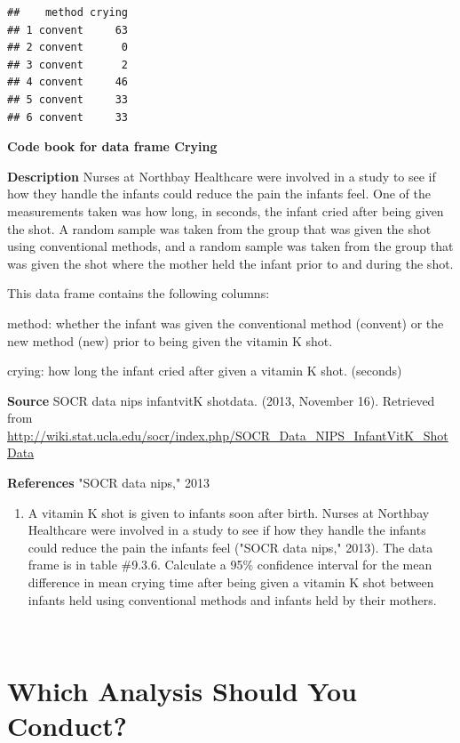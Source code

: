 \documentclass[
]{book}
\providecommand{\tightlist}{%
  \setlength{\itemsep}{0pt}\setlength{\parskip}{0pt}}
\begin{document}
\begin{verbatim}
##    method crying
## 1 convent     63
## 2 convent      0
## 3 convent      2
## 4 convent     46
## 5 convent     33
## 6 convent     33
\end{verbatim}

\textbf{Code book for data frame Crying}

\textbf{Description}
Nurses at Northbay Healthcare were involved in a study to see if how they handle the infants could reduce the pain the infants feel. One of the measurements taken was how long, in seconds, the infant cried after being given the shot. A random sample was taken from the group that was given the shot using conventional methods, and a random sample was taken from the group that was given the shot where the mother held the infant prior to and during the shot.

This data frame contains the following columns:

method: whether the infant was given the conventional method (convent) or the new method (new) prior to being given the vitamin K shot.

crying: how long the infant cried after given a vitamin K shot. (seconds)

\textbf{Source}
SOCR data nips infantvitK shotdata. (2013, November 16). Retrieved from
\url{http://wiki.stat.ucla.edu/socr/index.php/SOCR_Data_NIPS_InfantVitK_ShotData}

\textbf{References}
"SOCR data nips," 2013

\begin{enumerate}
\def\labelenumi{\arabic{enumi}.}
\setcounter{enumi}{7}
\tightlist
\item
  A vitamin K shot is given to infants soon after birth. Nurses at Northbay Healthcare were involved in a study to see if how they handle the infants could reduce the pain the infants feel ("SOCR data nips," 2013). The data frame is in table \#9.3.6. Calculate a 95\% confidence interval for the mean difference in mean crying time after being given a vitamin K shot between infants held using conventional methods and infants held by their mothers.
\end{enumerate}

\textbf{\\
}

\hypertarget{which-analysis-should-you-conduct}{%
\section{Which Analysis Should You Conduct?}\label{which-analysis-should-you-conduct}}
\end{document}
